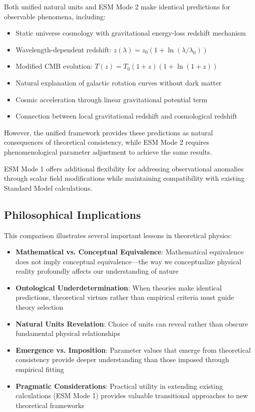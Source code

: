 \documentclass[12pt,a4paper]{article}
\begin{document}
	Both unified natural units and ESM Mode 2 make identical predictions for observable phenomena, including:
	
	\begin{itemize}
		\item Static universe cosmology with gravitational energy-loss redshift mechanism
		\item Wavelength-dependent redshift: $z(\lambda) = z_0(1 + \ln(\lambda/\lambda_0))$
		\item Modified CMB evolution: $T(z) = T_0(1+z)(1+\ln(1+z))$
		\item Natural explanation of galactic rotation curves without dark matter \cite{McGaugh2016}
		\item Cosmic acceleration through linear gravitational potential term
		\item Connection between local gravitational redshift and cosmological redshift \cite{Pound1960}
	\end{itemize}
	
	However, the unified framework provides these predictions as natural consequences of theoretical consistency, while ESM Mode 2 requires phenomenological parameter adjustment to achieve the same results.
	
	ESM Mode 1 offers additional flexibility for addressing observational anomalies through scalar field modifications while maintaining compatibility with existing Standard Model calculations.
	
	\subsection{Philosophical Implications}
	\label{subsec:philosophical_implications}
	
	This comparison illustrates several important lessons in theoretical physics:
	
	\begin{itemize}
		\item \textbf{Mathematical vs. Conceptual Equivalence}: Mathematical equivalence does not imply conceptual equivalence—the way we conceptualize physical reality profoundly affects our understanding of nature
		\item \textbf{Ontological Underdetermination}: When theories make identical predictions, theoretical virtues rather than empirical criteria must guide theory selection \cite{vanFraassen1980}
		\item \textbf{Natural Units Revelation}: Choice of units can reveal rather than obscure fundamental physical relationships \cite{Dirac1927}
		\item \textbf{Emergence vs. Imposition}: Parameter values that emerge from theoretical consistency provide deeper understanding than those imposed through empirical fitting
		\item \textbf{Pragmatic Considerations}: Practical utility in extending existing calculations (ESM Mode 1) provides valuable transitional approaches to new theoretical frameworks
	\end{itemize}
	
\end{document}
